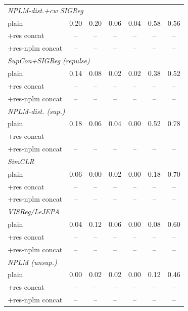 \begin{center}
\begin{longtable}{lcccccc}
\multicolumn{7}{l}{\emph{NPLM-dist.+cw SIGReg}} \\
\quad plain & 0.20 & 0.20 & 0.06 & 0.04 & 0.58 & 0.56 \\
\quad +res concat & -- & -- & -- & -- & -- & -- \\
\quad +res-nplm concat & -- & -- & -- & -- & -- & -- \\
\multicolumn{7}{l}{\emph{SupCon+SIGReg (repulse)}} \\
\quad plain & 0.14 & 0.08 & 0.02 & 0.02 & 0.38 & 0.52 \\
\quad +res concat & -- & -- & -- & -- & -- & -- \\
\quad +res-nplm concat & -- & -- & -- & -- & -- & -- \\
\multicolumn{7}{l}{\emph{NPLM-dist. (sup.)}} \\
\quad plain & 0.18 & 0.06 & 0.04 & 0.00 & 0.52 & 0.78 \\
\quad +res concat & -- & -- & -- & -- & -- & -- \\
\quad +res-nplm concat & -- & -- & -- & -- & -- & -- \\
\multicolumn{7}{l}{\emph{SimCLR}} \\
\quad plain & 0.06 & 0.00 & 0.02 & 0.00 & 0.18 & 0.70 \\
\quad +res concat & -- & -- & -- & -- & -- & -- \\
\quad +res-nplm concat & -- & -- & -- & -- & -- & -- \\
\multicolumn{7}{l}{\emph{VISReg/LeJEPA}} \\
\quad plain & 0.04 & 0.12 & 0.06 & 0.00 & 0.08 & 0.60 \\
\quad +res concat & -- & -- & -- & -- & -- & -- \\
\quad +res-nplm concat & -- & -- & -- & -- & -- & -- \\
\multicolumn{7}{l}{\emph{NPLM (unsup.)}} \\
\quad plain & 0.00 & 0.02 & 0.02 & 0.00 & 0.12 & 0.46 \\
\quad +res concat & -- & -- & -- & -- & -- & -- \\
\quad +res-nplm concat & -- & -- & -- & -- & -- & -- \\
\end{longtable}
\end{center}
